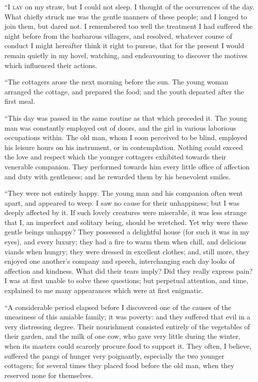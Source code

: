 
``\textsc{I lay} on my straw, but I could not
sleep. I thought of the occurrences of
the day. What chiefly struck me was
the gentle manners of these people; and
I longed to join them, but dared not.
I remembered too well the treatment I
had suffered the night before from the
barbarous villagers, and resolved, whatever
course of conduct I might hereafter
think it right to pursue, that for the
present I would remain quietly in my
hovel, watching, and endeavouring to
discover the motives which influenced
their actions.

``The cottagers arose the next morning
before the sun. The young woman
arranged the cottage, and prepared the
food; and the youth departed after the
first meal.

``This day was passed in the same
routine as that which preceded it. The
young man was constantly employed out
of doors, and the girl in various laborious
occupations within. The old man,
whom I soon perceived to be blind,
employed his leisure hours on his instrument,
or in contemplation. Nothing
could exceed the love and respect which
the younger cottagers exhibited towards
their venerable companion. They performed
towards him every little office
of affection and duty with gentleness;
and he rewarded them by his benevolent
smiles.

``They were not entirely happy. The
young man and his companion often
went apart, and appeared to weep. I
saw no cause for their unhappiness; but
I was deeply affected by it. If such
lovely creatures were miserable, it was
less strange that I, an imperfect and solitary
being, should be wretched. Yet
why were these gentle beings unhappy?
They possessed a delightful house (for
such it was in my eyes), and every
luxury; they had a fire to warm them
when chill, and delicious viands when
hungry; they were dressed in excellent
clothes; and, still more, they enjoyed
one another's company and speech,
interchanging each day looks of affection
and kindness. What did their
tears imply? Did they really express
pain? I was at first unable to solve
these questions; but perpetual attention,
and time, explained to me many
appearances which were at first enigmatic.

``A considerable period elapsed before
I discovered one of the causes of the uneasiness
of this amiable family; it was
poverty: and they suffered that evil in a
very distressing degree. Their nourishment
consisted entirely of the vegetables
of their garden, and the milk of one
cow, who gave very little during the
winter, when its masters could scarcely
procure food to support it. They
often, I believe, suffered the pangs of
hunger very poignantly, especially the
two younger cottagers; for several times
they placed food before the old man,
when they reserved none for themselves.

